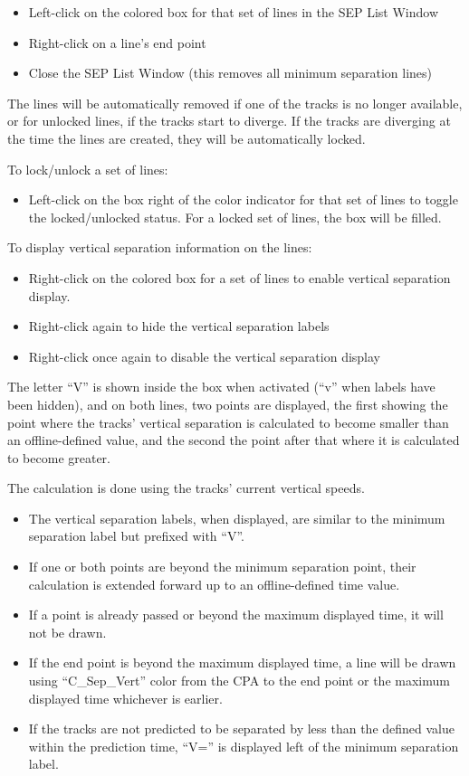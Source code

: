 \documentclass[11pt,a4paper]{memoir}
\begin{document}
\begin{itemize}
    \item Left-click on the colored box for that set of lines in the SEP List Window
    \item Right-click on a line’s end point
    \item Close the SEP List Window (this removes all minimum separation lines)
\end{itemize}

The lines will be automatically removed if one of the tracks is no longer available, or for unlocked lines, if the tracks start to diverge. If the tracks are diverging at the time the lines are created, they will be automatically locked.

To lock/unlock a set of lines:

\begin{itemize}
    \item Left-click on the box right of the color indicator for that set of lines to toggle the locked/unlocked status. For a locked set of lines, the box will be filled.
\end{itemize}

To display vertical separation information on the lines:

\begin{itemize}
    \item Right-click on the colored box for a set of lines to enable vertical separation display.
    \item Right-click again to hide the vertical separation labels
    \item Right-click once again to disable the vertical separation display
\end{itemize}

The letter “V” is shown inside the box when activated (“v” when labels have been hidden), and on both lines, two points are displayed, the first showing the point where the tracks’ vertical separation is calculated to become smaller than an offline-defined value, and the second the point after that where it is calculated to become greater. 

The calculation is done using the tracks’ current vertical speeds.

\begin{itemize}
    \item The vertical separation labels, when displayed, are similar to the minimum separation label but prefixed with “V”.
    \item If one or both points are beyond the minimum separation point, their calculation is extended forward up to an offline-defined time value.
    \item If a point is already passed or beyond the maximum displayed time, it will not be drawn.
    \item If the end point is beyond the maximum displayed time, a line will be drawn using “C\_Sep\_Vert” color from the CPA to the end point or the maximum displayed time whichever is earlier.
    \item If the tracks are not predicted to be separated by less than the defined value within the prediction time, “V=” is displayed left of the minimum separation label.
\end{itemize}
\end{document}
